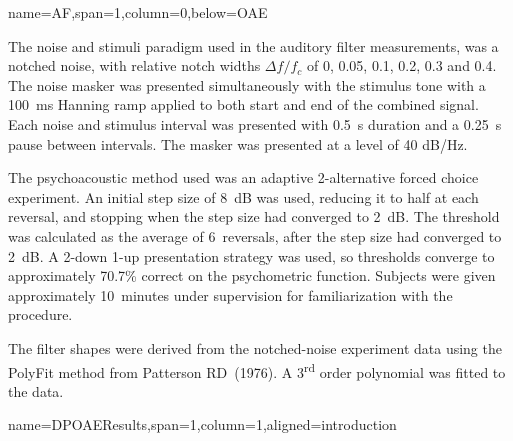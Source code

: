 \documentclass[paperwidth=100cm,paperheight=160cm,portrait,fontscale=0.2941]{baposter}
\begin{document}
\begin{poster}
{name=AF,span=1,column=0,below=OAE}
{\parskip 5pt

The noise and stimuli paradigm used in the auditory filter measurements, was a notched noise, with relative notch widths $\Delta f/f_c$ of 0, 0.05, 0.1, 0.2, 0.3 and 0.4. The noise masker was presented simultaneously with the stimulus tone with a 100~ms Hanning ramp applied to both start and end of the combined signal. Each noise and stimulus interval was presented with 0.5~s duration and a 0.25~s pause between intervals. The masker was presented at a level of 40 dB/Hz.

The psychoacoustic method used was an adaptive 2-alternative forced choice experiment. An initial step size of 8~dB was used, reducing it to half at each reversal, and stopping when the step size had converged to 2~dB. The threshold was calculated as the average of 6~reversals, after the step size had converged to 2~dB. A 2-down 1-up presentation strategy was used, so thresholds converge to approximately 70.7\% correct on the psychometric function. Subjects were given approximately 10~minutes under supervision for familiarization with the procedure.


The filter shapes were derived from the notched-noise experiment data using the PolyFit method from Patterson RD~(1976). A 3\textsuperscript{rd} order polynomial was fitted to the data.
}

{name=DPOAEResults,span=1,column=1,aligned=introduction}
{\parskip 5pt
 

~

}
\end{poster}
\end{document}
